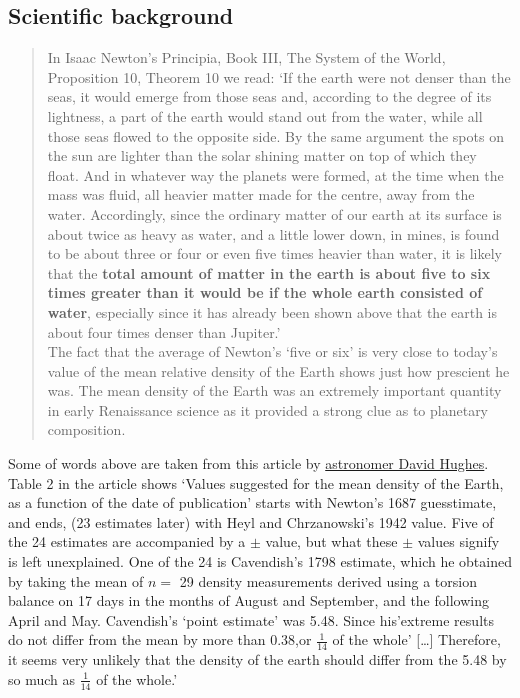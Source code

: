 \documentclass[
]{article}
\begin{document}
\hypertarget{scientific-background}{%
\subsection{Scientific background}\label{scientific-background}}

\begin{quote}
In Isaac Newton's Principia, Book III, The System of the World,
Proposition 10, Theorem 10 we read: `If the earth were not denser than
the seas, it would emerge from those seas and, according to the degree
of its lightness, a part of the earth would stand out from the water,
while all those seas flowed to the opposite side. By the same argument
the spots on the sun are lighter than the solar shining matter on top of
which they float. And in whatever way the planets were formed, at the
time when the mass was fluid, all heavier matter made for the centre,
away from the water. Accordingly, since the ordinary matter of our earth
at its surface is about twice as heavy as water, and a little lower
down, in mines, is found to be about three or four or even five times
heavier than water, it is likely that the \textbf{total amount of matter
in the earth is about five to six times greater than it would be if the
whole earth consisted of water}, especially since it has already been
shown above that the earth is about four times denser than Jupiter.'\\
\hspace*{0.333em}\hspace*{0.333em}\hspace*{0.333em}\hspace*{0.333em}The
fact that the average of Newton's `five or six' is very close to today's
value of the mean relative density of the Earth shows just how prescient
he was. The mean density of the Earth was an extremely important
quantity in early Renaissance science as it provided a strong clue as to
planetary composition.
\end{quote}

Some of words above are taken from this article by
\href{http://www.biostat.mcgill.ca/hanley/statbook/DensityOfEarth.pdf}{astronomer
David Hughes}. Table 2 in the article shows `Values suggested for the
mean density of the Earth, as a function of the date of publication'
starts with Newton's 1687 guesstimate, and ends, (23 estimates later)
with Heyl and Chrzanowski's 1942 value. Five of the 24 estimates are
accompanied by a \(\pm\) value, but what these \(\pm\) values signify is
left unexplained. One of the 24 is Cavendish's 1798 estimate, which he
obtained by taking the mean of \(n =\) 29 density measurements derived
using a torsion balance on 17 days in the months of August and
September, and the following April and May. Cavendish's `point estimate'
was 5.48. Since his'extreme results do not differ from the mean by more
than 0.38,or \(\frac{1}{14}\) of the whole' {[}\ldots{]} Therefore, it
seems very unlikely that the density of the earth should differ from the
5.48 by so much as \(\frac{1}{14}\) of the whole.'
\end{document}
